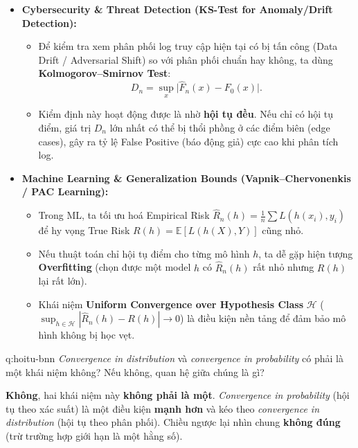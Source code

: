 \begin{itemize}
\item \textbf{Cybersecurity \& Threat Detection (KS-Test for Anomaly/Drift Detection):}
  \begin{itemize}
  \item Để kiểm tra xem phân phối log truy cập hiện tại có bị tấn công (Data Drift / Adversarial Shift) so với phân phối chuẩn hay không, ta dùng \textbf{Kolmogorov--Smirnov Test}:
  \[ D_n=\sup_{x}\big|\widehat F_n(x)-F_0(x)\big|. \]
  \item Kiểm định này hoạt động được là nhờ \textbf{hội tụ đều}. Nếu chỉ có hội tụ điểm, giá trị $D_n$ lớn nhất có thể bị thổi phồng ở các điểm biên (edge cases), gây ra tỷ lệ False Positive (báo động giả) cực cao khi phân tích log.
  \end{itemize}
\item \textbf{Machine Learning \& Generalization Bounds (Vapnik--Chervonenkis / PAC Learning):}
  \begin{itemize}
  \item Trong ML, ta tối ưu hoá Empirical Risk $\widehat R_n(h)=\frac1n\sum L(h(x_i),y_i)$ để hy vọng True Risk $R(h)=\mathbb{E}[L(h(X),Y)]$ cũng nhỏ.
  \item Nếu thuật toán chỉ hội tụ điểm cho từng mô hình $h$, ta dễ gặp hiện tượng \textbf{Overfitting} (chọn được một model $h$ có $\widehat R_n(h)$ rất nhỏ nhưng $R(h)$ lại rất lớn).
  \item Khái niệm \textbf{Uniform Convergence over Hypothesis Class} $\mathcal{H}$ ($\sup_{h\in\mathcal{H}}|\widehat R_n(h)-R(h)|\to 0$) là điều kiện nền tảng để đảm bảo mô hình không bị học vẹt.
  \end{itemize}
\end{itemize}


\begin{cauhoi}{q:hoitu-bnn}
\textit{Convergence in distribution} và \textit{convergence in probability} có phải là một khái niệm không? Nếu không, quan hệ giữa chúng là gì?
\end{cauhoi}

\begin{chot}
\textbf{Không}, hai khái niệm này \textbf{không phải là một}. \emph{Convergence in probability} (hội tụ theo xác suất) là một điều kiện \textbf{mạnh hơn} và kéo theo \emph{convergence in distribution} (hội tụ theo phân phối). Chiều ngược lại nhìn chung \textbf{không đúng} (trừ trường hợp giới hạn là một hằng số).
\end{chot}

